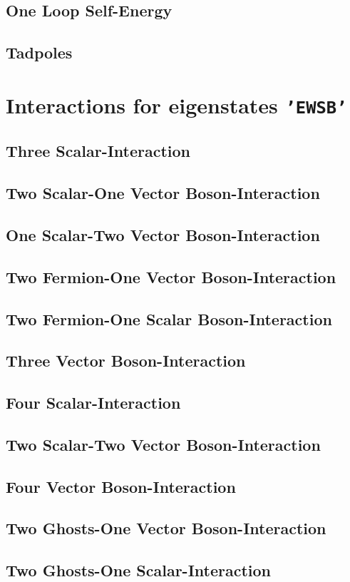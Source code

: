 \documentclass[A4]{article}
\begin{document}
\subsection{One Loop Self-Energy}
 
\subsection{Tadpoles}
 
\section{Interactions for eigenstates {\tt 'EWSB'}}
\subsection{Three Scalar-Interaction}

\subsection{Two Scalar-One Vector Boson-Interaction}

\subsection{One Scalar-Two Vector Boson-Interaction}

\subsection{Two Fermion-One Vector Boson-Interaction}

\subsection{Two Fermion-One Scalar Boson-Interaction}

\subsection{Three Vector Boson-Interaction}

\subsection{Four Scalar-Interaction}

\subsection{Two Scalar-Two Vector Boson-Interaction}

\subsection{Four Vector Boson-Interaction}

\subsection{Two Ghosts-One Vector Boson-Interaction}

\subsection{Two Ghosts-One Scalar-Interaction}


\end{document}
